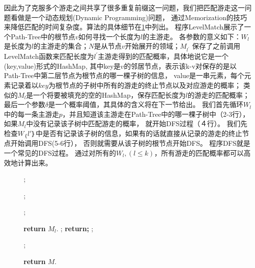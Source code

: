 \documentclass[master]{njuthesis}
\begin{document}
因此为了克服多个游走之间共享了很多重复前缀这一问题，我们把匹配游走这一问题看做是一个动态规划(Dynamic Programming)问题，
通过Memorization的技巧来降低匹配的时间复杂度。算法的具体细节在\ref{alg:dp}中列出。
程序LevelMatch展示了一个Path-Tree中的根节点$v$如何寻找一个长度为$l$的主游走。
各参数的意义如下：$W_l$是长度为$l$的主游走的集合；$N$是从节点$v$开始展开的领域；$M_{l^\prime}$ 
保存了之前调用LevelMatch函数来匹配长度为$l^\prime$主游走得到的匹配概率，具体地说它是一个(key,value)形式的HashMap,
其中key是$v$的邻居节点，表示该k-v对保存的是以Path-Tree中第二层节点为根节点的哪一棵子树的信息，
value是一串元素，每个元素记录着以$key$为根节点的子树中所有的游走的终止节点以及对应游走的概率；
类似的$M_l$是一个将要被填充的空的HashMap，保存匹配长度为$l$的游走的匹配概率；
最后一个参数$\delta$是一个概率阈值，其具体的含义将在下一节给出。
我们首先循环$W_l$中的每一条主游走$p$，并且知道该主游走在Path-Tree中的哪一棵子树中（2-3行），如果$M_l$中没有记录该子树中匹配游走的概率，
就开始DFS过程（４行）。
我们先检查$W_｛l\prime｝$中是否有记录该子树的信息，如果有的话就直接从记录的游走的终止节点开始调用DFS(5-6行），
否则就需要从该子树的根节点开始DFS。
程序DFS就是一个常见的DFS过程。
通过对所有的$W_l, (l \leq k)$，所有游走的匹配概率都可以高效地计算出来。


\begin{figure}
\begin{algorithm}[H]
\label{alg:dp}
\begin{algorithmic}[1]
		;
				
						\State \parbox[t]{\dimexpr\linewidth-\algorithmicindent} {;}	
					\Else 
								\State \parbox[t]{\dimexpr\linewidth-\algorithmicindent}{;}
							\EndFor
						\EndFor
					\EndIf			
				
			\EndFor
	\EndFor
	\State \textbf{return} $M_l$.
\EndProcedure
{}
	;
		\State \textbf{return;} 
	\EndIf
		;   %
	\Else
			\State \parbox[t]{\dimexpr\linewidth-\algorithmicindent} {;}
		\EndFor
	\EndIf
	\State \textbf{return} $M$.
\EndProcedure
\end{algorithmic}
\end{algorithm}
\end{figure}
\end{document}
